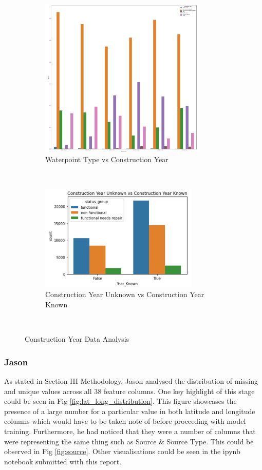 \documentclass[conference]{IEEEtran}
\begin{document}
\begin{figure}[t!]
    \centering
    \begin{subfigure}[t]{0.5\textwidth}
      \centering
      \includegraphics[height=3in]{figures/tom_da_construction_year_1}
      \caption{Waterpoint Type vs Construction Year}
    \end{subfigure}%
    ~
    \begin{subfigure}[t]{0.5\textwidth}
      \centering
      \includegraphics[height=2in]{figures/tom_unknown_cy.png}
      \caption{Construction Year Unknown vs Construction Year Known}
    \end{subfigure}
    ~
    \caption{Construction Year Data Analysis}
    \label{fig:construction_year}
\end{figure}

\subsubsection{Jason}

As stated in Section III Methodology, Jason analysed the distribution of missing and unique values across all 38 feature columns. One key highlight of  this stage could be seen in Fig \ref{fig:lat_long_distribution}. This figure showcases the  presence of a large number for a particular value in both latitude and longitude columns which would have to be taken note of before proceeding with model training. Furthermore, he had noticed that they were a number of columns that were representing the same thing such as Source \& Source Type. This could be observed in Fig \ref{fig:source}. Other visualisations could be seen in the ipynb notebook submitted with this report.
\end{document}
